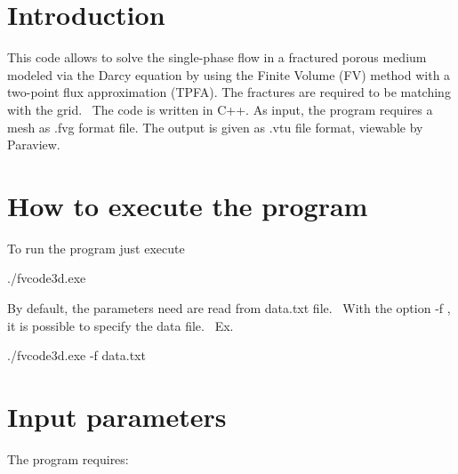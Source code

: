 \hypertarget{index_intro}{}\section{Introduction}\label{index_intro}
This code allows to solve the single-\/phase flow in a fractured porous medium modeled via the Darcy equation by using the Finite Volume (FV) method with a two-\/point flux approximation (T\+P\+FA). The fractures are required to be matching with the grid.~\newline
 The code is written in C++. As input, the program requires a mesh as \textquotesingle{}.fvg\textquotesingle{} format file. The output is given as \textquotesingle{}.vtu\textquotesingle{} file format, viewable by Paraview.~\newline
 \hypertarget{index_howto}{}\section{How to execute the program}\label{index_howto}
To run the program just execute~\newline

\begin{DoxyCode}
./fvcode3d.exe
\end{DoxyCode}
 By default, the parameters need are read from data.\+txt file.~\newline
 With the option \textquotesingle{}-\/f \textquotesingle{}, it is possible to specify the data file.~\newline
 Ex.~\newline

\begin{DoxyCode}
./fvcode3d.exe -f data.txt
\end{DoxyCode}
\hypertarget{index_input}{}\section{Input parameters}\label{index_input}
The program requires\+:~\newline

